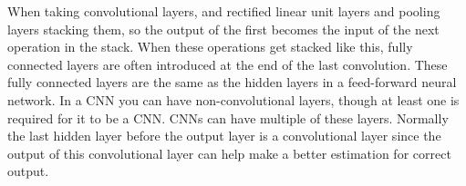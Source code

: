 When taking convolutional layers, and rectified linear unit layers and pooling layers stacking them, so the output of the first becomes the input of the next operation in the stack. When these operations get stacked like this, fully connected layers are often introduced at the end of the last convolution. These fully connected layers are the same as the hidden layers in a feed-forward neural network. In a CNN you can have non-convolutional layers, though at least one is required for it to be a CNN. CNNs can have multiple of these layers. Normally the last hidden layer before the output layer is a convolutional layer since the output of this convolutional layer can help make a better estimation for correct output.
